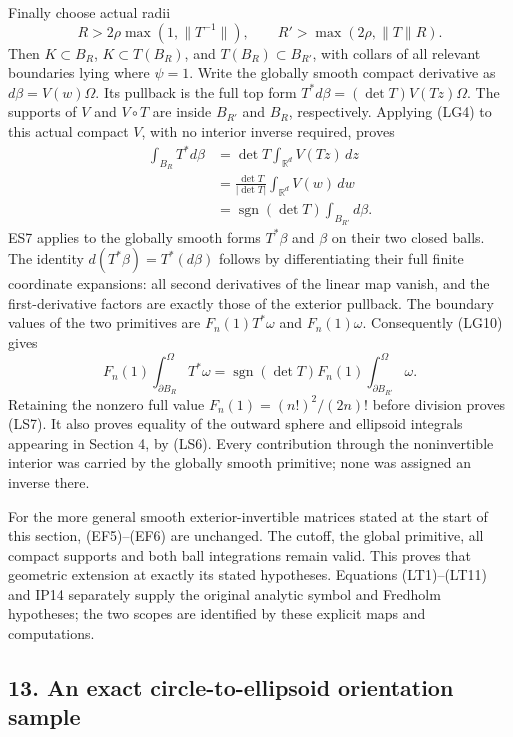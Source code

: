 \documentclass[
  11pt,
]{article}
\begin{document}
Finally choose actual radii \[
 R>2\rho\max(1,\|T^{-1}\|),\qquad
 R'>\max(2\rho,\|T\|R).
 \tag{LG9}
\] Then \(K\subset B_R\), \(K\subset T(B_R)\), and
\(T(B_R)\subset B_{R'}\), with collars of all relevant boundaries lying
where \(\psi=1\). Write the globally smooth compact derivative as
\(d\beta=V(w)\Omega\). Its pullback is the full top form
\(T^*d\beta=(\det T)V(Tz)\Omega\). The supports of \(V\) and
\(V\circ T\) are inside \(B_{R'}\) and \(B_R\), respectively. Applying
(LG4) to this actual compact \(V\), with no interior inverse required,
proves \[
\begin{aligned}
 \int_{B_R}T^*d\beta
 &=\det T\int_{\mathbb R^d}V(Tz)\,dz\\
 &=\frac{\det T}{|\det T|}
                       \int_{\mathbb R^d}V(w)\,dw\\
 &=\operatorname{sgn}(\det T)\int_{B_{R'}}d\beta.
\end{aligned}
 \tag{LG10}
\] ES7 applies to the globally smooth forms \(T^*\beta\) and \(\beta\)
on their two closed balls. The identity \(d(T^*\beta)=T^*(d\beta)\)
follows by differentiating their full finite coordinate expansions: all
second derivatives of the linear map vanish, and the first-derivative
factors are exactly those of the exterior pullback. The boundary values
of the two primitives are \(F_n(1)T^*\omega\) and \(F_n(1)\omega\).
Consequently (LG10) gives \[
 F_n(1)\int_{\partial B_R}^{\Omega}T^*\omega
 =\operatorname{sgn}(\det T)F_n(1)
                         \int_{\partial B_{R'}}^{\Omega}\omega.
 \tag{LG11}
\] Retaining the nonzero full value \(F_n(1)=(n!)^2/(2n)!\) before
division proves (LS7). It also proves equality of the outward sphere and
ellipsoid integrals appearing in Section 4, by (LS6). Every contribution
through the noninvertible interior was carried by the globally smooth
primitive; none was assigned an inverse there.

For the more general smooth exterior-invertible matrices stated at the
start of this section, (EF5)--(EF6) are unchanged. The cutoff, the
global primitive, all compact supports and both ball integrations remain
valid. This proves that geometric extension at exactly its stated
hypotheses. Equations (LT1)--(LT11) and IP14 separately supply the
original analytic symbol and Fredholm hypotheses; the two scopes are
identified by these explicit maps and computations.

\subsection{13. An exact circle-to-ellipsoid orientation
sample}\label{an-exact-circle-to-ellipsoid-orientation-sample}
\end{document}
